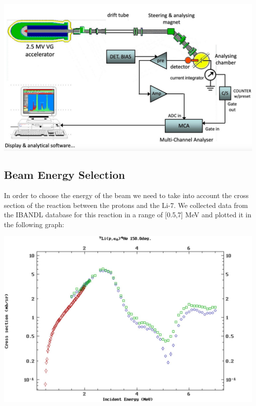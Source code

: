 \documentclass{article}
\begin{document}
\begin{multicols}{2}
\begin{center}
    \label{TT_21}
    \centering
    \includegraphics[scale = 0.15]{../images/scheme.jpeg}
\end{center}

\subsection{Beam Energy Selection}
    \label{sec:beamenergyselection}

In order to choose the energy of the beam we need to take into account the cross section of the reaction between the protons and the Li-7. We collected data from the IBANDL database for this reaction in a range of [0.5,7] MeV and plotted it in the following graph:

\begin{center}
    \label{TT_21}
    \centering
    \includegraphics[scale = 0.17]{../images/Li_crosssection_energy.jpeg}
\end{center}


\end{multicols}
\end{document}
